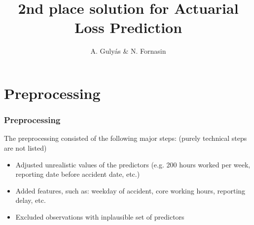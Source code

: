 \documentclass{beamer}
\title{2nd place solution for Actuarial Loss Prediction} %
\author{A. Guly\'{a}s \& N. Fornasin} %
\institute[ALU] %
{
Team Boosted Goose\\ %
\medskip
}
\date{\quad} %
\begin{document}
\begin{frame}
\titlepage %
\end{frame}






\section{Preprocessing}
\begin{frame}
\frametitle{Preprocessing}
The preprocessing consisted of the following major steps: (purely technical steps are not listed)
\begin{itemize}
\item Adjusted unrealistic values of the predictors (e.g. 200 hours worked per week, reporting date before accident date, etc.)
\item Added features, such as: weekday of accident, core working hours, reporting delay, etc.
\item Excluded observations with inplausible set of predictors
\end{itemize}
\end{frame}
\end{document}
